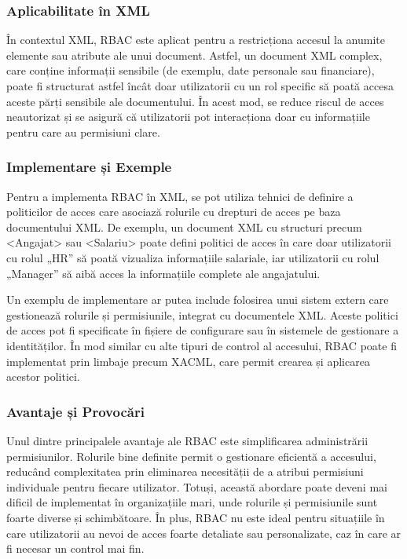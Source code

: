 \documentclass[runningheads]{llncs}
\begin{document}
\begin{spacing}{1.5}
\subsubsection{Aplicabilitate în XML}

În contextul XML, RBAC este aplicat pentru a res\-tricționa accesul la anumite elemente sau atribute ale unui document. Astfel, un document XML complex, care conține informații sensibile (de exemplu, date personale sau financiare), poate fi structurat astfel încât doar utilizatorii cu un rol specific să poată accesa aceste părți sensibile ale documentului. În acest mod, se reduce riscul de acces neautorizat și se asigură că utilizatorii pot interacționa doar cu informațiile pentru care au permisiuni clare.

\subsubsection{Implementare și Exemple}

Pentru a implementa RBAC în XML, se pot utiliza tehnici de definire a politicilor de acces care asociază rolurile cu drepturi de acces pe baza documentului XML. De exemplu, un document XML cu structuri precum <Angajat> sau <Salariu> poate defini politici de acces în care doar utilizatorii cu rolul „HR” să poată vizualiza informațiile salariale, iar utilizatorii cu rolul „Manager” să aibă acces la informațiile complete ale angajatului.

Un exemplu de implementare ar putea include folosirea unui sistem extern care gestionează rolurile și permisiunile, integrat cu documentele XML. Aceste politici de acces pot fi specificate în fișiere de configurare sau în sistemele de gestionare a identităților. În mod similar cu alte tipuri de control al accesului, RBAC poate fi implementat prin limbaje precum XACML, care permit crearea și aplicarea acestor politici.

\subsubsection{Avantaje și Provocări}

Unul dintre principalele avantaje ale RBAC este simplificarea administrării permisiunilor. Rolurile bine definite permit o gestionare eficientă a accesului, reducând complexitatea prin eliminarea necesității de a atribui permisiuni individuale pentru fiecare utilizator. Totuși, această abordare poate deveni mai dificil de implementat în organizațiile mari, unde rolurile și permisiunile sunt foarte diverse și schimbătoare. În plus, RBAC nu este ideal pentru situațiile în care utilizatorii au nevoi de acces foarte detaliate sau personalizate, caz în care ar fi necesar un control mai fin.




\end{spacing}
\end{document}
